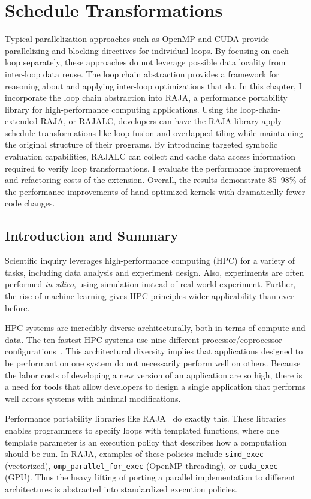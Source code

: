 \chapter{Schedule Transformations}\label{chap:RAJALC}

Typical parallelization approaches such as OpenMP and CUDA provide parallelizing and blocking directives for individual loops.
By focusing on each loop separately, these approaches do not leverage possible data locality from inter-loop data reuse.
The loop chain abstraction provides a framework for reasoning about and applying inter-loop optimizations that do.
In this chapter, I incorporate the loop chain abstraction into RAJA, a performance portability library for high-performance computing applications.
Using the loop-chain-extended RAJA, or RAJALC, developers can have the RAJA library apply schedule transformations like loop fusion and overlapped tiling while maintaining the original structure of their programs. 
By introducing targeted symbolic evaluation capabilities, RAJALC can collect and cache data access information required to verify loop transformations.
I evaluate the performance improvement and refactoring costs of the extension.
Overall, the results demonstrate 85--98\% of the performance improvements of hand-optimized kernels with dramatically fewer code changes.

\section{Introduction and Summary}
Scientific inquiry leverages high-performance computing (HPC) for a variety of
tasks, including data analysis and experiment design. 
Also, experiments are often performed \textit{in silico}, using 
simulation instead of real-world experiment.
Further, the rise of machine learning gives HPC principles wider
applicability than ever before.

HPC systems are incredibly diverse architecturally, 
both in terms of compute and data.
The ten fastest HPC systems use nine different processor/coprocessor
configurations~\cite{top500}.
This architectural diversity implies that applications designed to be
performant on one system do not necessarily perform well on others.
Because the labor costs of developing a new version of an application are so high, 
there is a need for tools that allow developers to design a single application
that performs well across systems with minimal modifications.

Performance portability libraries like RAJA~\cite{hornung2014RAJA} do exactly this.
These libraries enables programmers to specify loops with templated functions,
where one template parameter is an execution policy that describes how a computation should be run.
In RAJA, examples of these policies include \verb.simd_exec. (vectorized), \verb.omp_parallel_for_exec. (OpenMP threading), or \verb.cuda_exec. (GPU).
Thus the heavy lifting of porting a parallel implementation to different 
architectures is abstracted into standardized execution policies.


